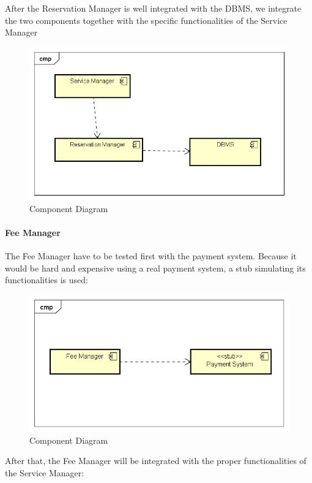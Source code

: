 After the Reservation Manager is well integrated with the DBMS, we integrate the two components together with the specific functionalities of the Service Manager

\begin{figure}[H]	
	\centering
	\includegraphics[width=\textwidth]{img/ResMan_SrvMan_int}
	\caption{Component Diagram}
\end{figure}
\paragraph{Fee Manager}
The Fee Manager have to be tested first with the payment system. Because it would be hard and expensive using a real payment system, a stub simulating its functionalities is used:

\begin{figure}[H]	
	\centering
	\includegraphics[width=\textwidth]{img/FeeMan_PaySys_int}
	\caption{Component Diagram}
\end{figure}
After that, the Fee Manager will be integrated with the proper functionalities of the Service Manager:

